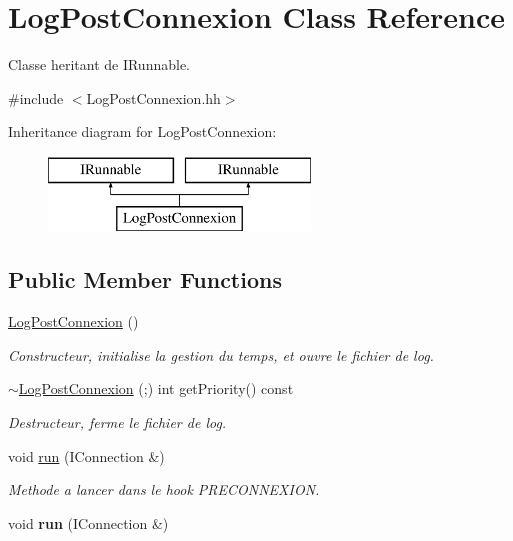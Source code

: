 \hypertarget{class_log_post_connexion}{}\section{Log\+Post\+Connexion Class Reference}
\label{class_log_post_connexion}


Classe heritant de I\+Runnable.  




{\ttfamily \#include $<$Log\+Post\+Connexion.\+hh$>$}

Inheritance diagram for Log\+Post\+Connexion\+:\begin{figure}[H]
\begin{center}
\leavevmode
\includegraphics[height=2.000000cm]{class_log_post_connexion}
\end{center}
\end{figure}
\subsection*{Public Member Functions}
\begin{DoxyCompactItemize}
\item 
\hypertarget{class_log_post_connexion_a7a1e2f7c072ce9513cfa65449e937800}{}\hyperlink{class_log_post_connexion_a7a1e2f7c072ce9513cfa65449e937800}{Log\+Post\+Connexion} ()\label{class_log_post_connexion_a7a1e2f7c072ce9513cfa65449e937800}

\begin{DoxyCompactList}\small\item\em Constructeur, initialise la gestion du temps, et ouvre le fichier de log. \end{DoxyCompactList}\item 
\hyperlink{class_log_post_connexion_a94c24ed16efd4f71efca9d9812f2551a}{$\sim$\+Log\+Post\+Connexion} (;) int get\+Priority() const 
\begin{DoxyCompactList}\small\item\em Destructeur, ferme le fichier de log. \end{DoxyCompactList}\item 
\hypertarget{class_log_post_connexion_add5d4461f61eee5d0026a08faa033674}{}void \hyperlink{class_log_post_connexion_add5d4461f61eee5d0026a08faa033674}{run} (I\+Connection \&)\label{class_log_post_connexion_add5d4461f61eee5d0026a08faa033674}

\begin{DoxyCompactList}\small\item\em Methode a lancer dans le hook P\+R\+E\+C\+O\+N\+N\+E\+X\+I\+O\+N. \end{DoxyCompactList}\item 
\hypertarget{class_log_post_connexion_add5d4461f61eee5d0026a08faa033674}{}void {\bfseries run} (I\+Connection \&)\label{class_log_post_connexion_add5d4461f61eee5d0026a08faa033674}

\end{DoxyCompactItemize}


